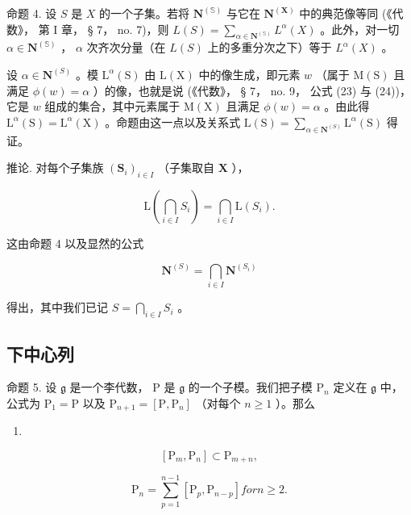 命题 4. 设 \(S\) 是 \(X\) 的一个子集。若将 \(\mathbf{N}^{(\mathbb{S})}\) 与它在 \(\mathbf{N}^{(\mathbf{X})}\) 中的典范像等同 (《代数》， 第 I 章， § 7， no. 7)，则 \(L(S) = \sum_{\alpha \in \mathbf{N}^{(\mathbb{S})}} L^{\alpha}(X)\) 。此外，对一切 \(\alpha \in \mathbf{N}^{(\mathbb{S})}\) ， \(\alpha\) 次齐次分量（在 \(L(S)\) 上的多重分次之下）等于 \(L^{\alpha}(X)\) 。

 设 \(\alpha \in \mathbf{N}^{(S)}\) 。模 \(\mathrm{L}^{\alpha}(\mathrm{S})\) 由 \(\mathrm{L}(\mathrm{X})\) 中的像生成，即元素 \(w\) （属于 \(\mathrm{M}(\mathrm{S})\) 且满足 \(\phi(w) = \alpha\) ）的像，也就是说 (《代数》， § 7， no. 9， 公式 (23) 与 (24))，它是 \(w\) 组成的集合，其中元素属于 \(\mathrm{M}(\mathrm{X})\) 且满足 \(\phi(w) = \alpha\) 。由此得 \(\mathrm{L}^{\alpha}(\mathrm{S}) = \mathrm{L}^{\alpha}(\mathrm{X})\) 。命题由这一点以及关系式 \(\mathrm{L}(\mathrm{S}) = \sum_{\alpha \in \mathbf{N}^{(S)}}\mathrm{L}^{\alpha}(\mathrm{S})\) 得证。

推论. 对每个子集族 \((\mathbf{S}_i)_{i\in I}\) （子集取自 \(\mathbf{X}\) ），

\[
\mathrm{L} \left(\bigcap_ {i \in I} S _ {i}\right) = \bigcap_ {i \in I} \mathrm{L} (S _ {i}).\tag{16}
\]

这由命题 4 以及显然的公式

\[
\mathbf {N} ^ {(S)} = \bigcap_ {i \in I} \mathbf {N} ^ {(S _ {i})}\tag{17}
\]

得出，其中我们已记 \(S = \bigcap_{i \in I} S_i\) 。

\subsection{下中心列}

命题 5. 设 \(\mathfrak{g}\) 是一个李代数， \(\mathrm{P}\) 是 \(\mathfrak{g}\) 的一个子模。我们把子模 \(\mathrm{P}_n\) 定义在 \(\mathfrak{g}\) 中，公式为 \(\mathrm{P}_1 = \mathrm{P}\) 以及 \(\mathrm{P}_{n+1} = [\mathrm{P},\mathrm{P}_n]\) （对每个 \(n\geqslant 1\) ）。那么

\begin{enumerate}
\def\labelenumi{(\arabic{enumi})}
\setcounter{enumi}{17}
\tightlist
\item
\end{enumerate}

\[
[ \mathrm{P} _ {m}, \mathrm{P} _ {n} ] \subset \mathrm{P} _ {m + n},\tag{18}
\]

\[
\mathrm{P} _ {n} = \sum_ {p = 1} ^ {n - 1} \left[ \mathrm{P} _ {p}, \mathrm{P} _ {n - p} \right] for n \geqslant 2.\tag{19}
\]

